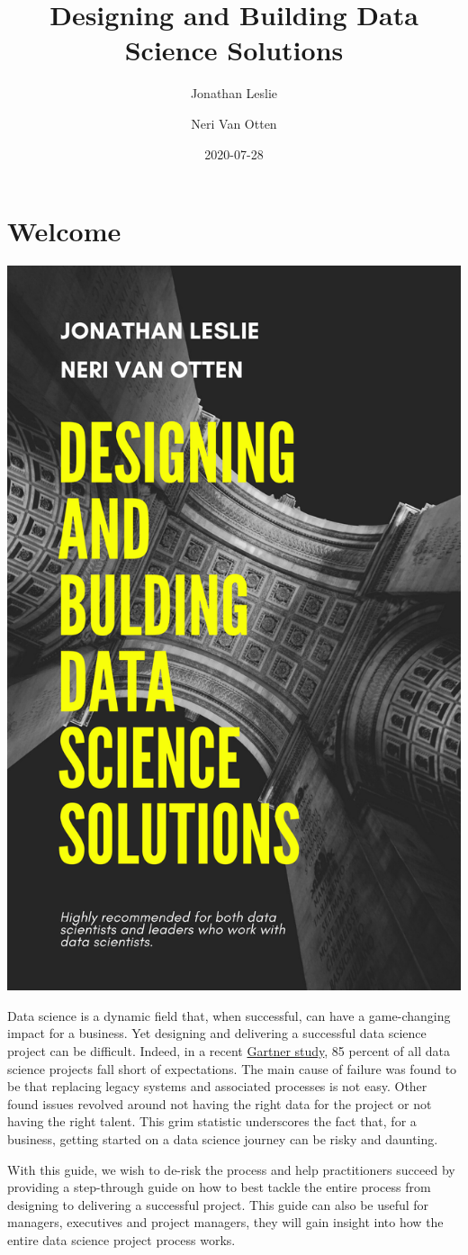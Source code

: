 \documentclass[
]{book}
\title{Designing and Building Data Science Solutions}
\author{Jonathan Leslie \and Neri Van Otten}
\date{2020-07-28}
\begin{document}
\frontmatter
\maketitle

\mainmatter
\hypertarget{welcome}{%
\chapter*{Welcome}\label{welcome}}

\includegraphics[width=0.5\linewidth]{figures/Designing and bulding data science solutions}

Data science is a dynamic field that, when successful, can have a
game-changing impact for a business. Yet designing and delivering a
successful data science project can be difficult. Indeed, in a recent
\href{https://www.gartner.com/en/newsroom/press-releases/2018-02-13-gartner-says-nearly-half-of-cios-are-planning-to-deploy-artificial-intelligence}{Gartner
study}, 85 percent of all data science projects fall short of
expectations. The main cause of failure was found to be that replacing
legacy systems and associated processes is not easy. Other found issues
revolved around not having the right data for the project or not having
the right talent. This grim statistic underscores the fact that, for a
business, getting started on a data science journey can be risky and
daunting.

With this guide, we wish to de-risk the process and help practitioners
succeed by providing a step-through guide on how to best tackle the
entire process from designing to delivering a successful project. This
guide can also be useful for managers, executives and project managers,
they will gain insight into how the entire data science project process
works.
\end{document}
